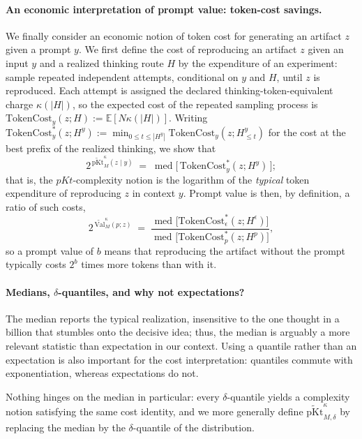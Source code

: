 \documentclass[letterpaper]{article} %
\theoremstyle{definition}
\theoremstyle{remark}
\newcommand{\E}{\mathbb{E}}
\newcommand{\Val}{\mathrm{Val}}
\newcommand{\eps}{\epsilon}
\newcommand{\TC}{\mathrm{TokenCost}}
\DeclareMathOperator{\med}{med}
\newcommand{\pKt}{\mathrm{pKt}}
\newcommand{\pKtt}{\widetilde{\pKt}}
\begin{document}
\paragraph{An economic interpretation of prompt value: token-cost savings.}
We finally consider an economic notion of token cost for generating an artifact
$z$ given a prompt $y$. We first define the cost of reproducing an artifact $z$
given an input $y$ and a realized thinking route $H$ by the expenditure of an
experiment: sample repeated independent attempts, conditional on $y$ and $H$,
until $z$ is reproduced. Each attempt is assigned the declared
thinking-token-equivalent charge $\kappa(|H|)$, so the expected cost of the
repeated sampling process is
$\TC_y(z; H) := \E[N\kappa(|H|)]$. 
Writing
$\TC^*_y(z; H^y) := \min_{0\le t\le |H^y|} \TC_y(z; H^y_{\le t})$ for the
cost at the best prefix of the realized thinking, we show that
\[
2^{\,\pKtt^{\kappa}_M(z \mid y)} \;=\; \med\bigl[\, \TC^*_y(z; H^y) \,\bigr];
\]
that is, the $pKt$-complexity notion is  the logarithm of the \emph{typical} token
expenditure of reproducing $z$ in context $y$. Prompt value is then, by
definition, a ratio of such costs,
\[
2^{\,\widetilde{\Val}^{\kappa}_{M}(p;z)}
\;=\;
\frac{\med_{}\bigl[\TC^*_\eps(z; H^\eps)\bigr]}
     {\med_{}\bigl[\TC^*_p(z; H^p)\bigr]} ,
\]
so a prompt value of $b$ means that reproducing the artifact without the prompt
typically costs $2^b$ times more tokens than with it.

\paragraph{Medians, $\delta$-quantiles, and why not expectations?}
The median reports the typical realization, insensitive to the one thought in a
billion that stumbles onto the decisive idea; thus, the median is arguably a more relevant statistic than expectation in our context. Using a quantile rather than an expectation is also important for the cost interpretation: quantiles commute with exponentiation, whereas expectations do not.

Nothing hinges on the median in particular: every
$\delta$-quantile yields a complexity notion satisfying the same cost identity, and
we more generally define $\pKtt^{\kappa}_{M,\delta}$ by replacing the median by the $\delta$-quantile of the distribution.
\end{document}
